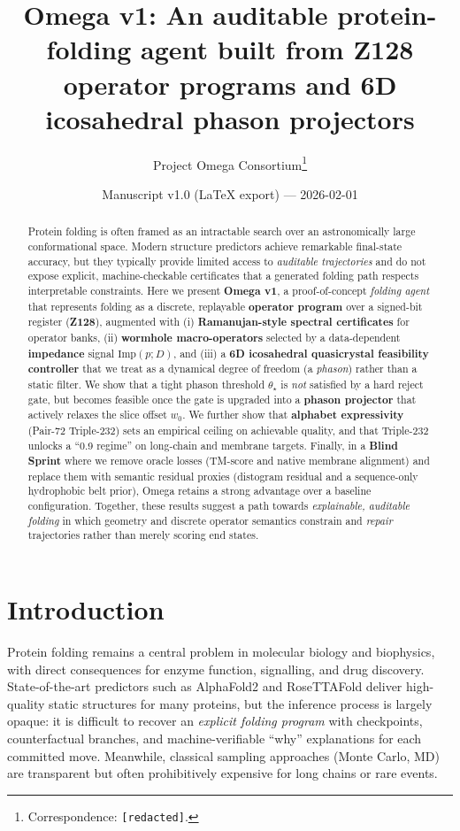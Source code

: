 \documentclass[11pt]{article}
\title{\textbf{Omega v1: An auditable protein-folding agent built from Z128 operator programs and 6D icosahedral phason projectors}}
\author{Project Omega Consortium\footnote{Correspondence: \texttt{[redacted]}.}}
\date{Manuscript v1.0 (LaTeX export) --- 2026-02-01}
\begin{document}
\maketitle

\begin{abstract}
Protein folding is often framed as an intractable search over an astronomically large conformational space.
Modern structure predictors achieve remarkable final-state accuracy, but they typically provide limited access to \emph{auditable trajectories} and do not expose explicit, machine-checkable certificates that a generated folding path respects interpretable constraints.
Here we present \textbf{Omega v1}, a proof-of-concept \emph{folding agent} that represents folding as a discrete, replayable \textbf{operator program} over a signed-bit register (\textbf{Z128}), augmented with (i) \textbf{Ramanujan-style spectral certificates} for operator banks, (ii) \textbf{wormhole macro-operators} selected by a data-dependent \textbf{impedance} signal $\mathrm{Imp}(p;D)$, and (iii) a \textbf{6D icosahedral quasicrystal feasibility controller} that we treat as a dynamical degree of freedom (a \emph{phason}) rather than a static filter.
We show that a tight phason threshold $\theta_\star$ is \emph{not} satisfied by a hard reject gate, but becomes feasible once the gate is upgraded into a \textbf{phason projector} that actively relaxes the slice offset $w_0$.
We further show that \textbf{alphabet expressivity} (Pair-72 \textrightarrow{} Triple-232) sets an empirical ceiling on achievable quality, and that Triple-232 unlocks a ``0.9 regime'' on long-chain and membrane targets.
Finally, in a \textbf{Blind Sprint} where we remove oracle losses (TM-score and native membrane alignment) and replace them with semantic residual proxies (distogram residual and a sequence-only hydrophobic belt prior), Omega retains a strong advantage over a baseline configuration.
Together, these results suggest a path towards \emph{explainable, auditable folding} in which geometry and discrete operator semantics constrain and \emph{repair} trajectories rather than merely scoring end states.
\end{abstract}

\section*{Introduction}
Protein folding remains a central problem in molecular biology and biophysics, with direct consequences for enzyme function, signalling, and drug discovery.
State-of-the-art predictors such as AlphaFold2 and RoseTTAFold deliver high-quality static structures for many proteins, but the inference process is largely opaque: it is difficult to recover an \emph{explicit folding program} with checkpoints, counterfactual branches, and machine-verifiable ``why'' explanations for each committed move.
Meanwhile, classical sampling approaches (Monte Carlo, MD) are transparent but often prohibitively expensive for long chains or rare events.
\end{document}
